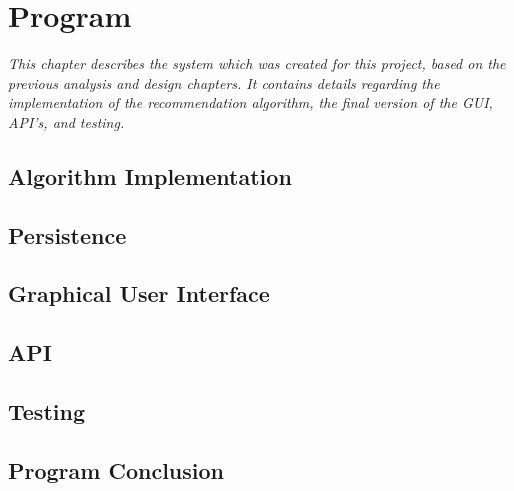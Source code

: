 \chapter{Program}

\textit{This chapter describes the system which was created for this project, based on the previous analysis and design chapters. It contains details regarding the implementation of the recommendation algorithm, the final version of the GUI, API's, and testing.}

\section{Algorithm Implementation}
\label{AlgorithmProg}

\section{Persistence}
\label{Persistence}

\section{Graphical User Interface}
\label{GUI}

\section{API}
\label{API}

\section{Testing}
\label{Testing}

\section{Program Conclusion}
\label{ProCon}
